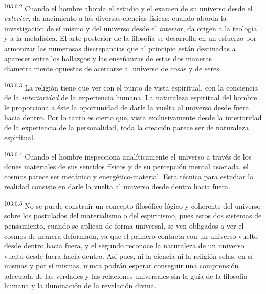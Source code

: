 \documentclass[twoside, 11pt]{book}
\begin{document}
\par
\textsuperscript{103:6.2} Cuando el hombre aborda el estudio y el examen de su universo desde el \textit{exterior}, da nacimiento a las diversas ciencias físicas; cuando aborda la investigación de sí mismo y del universo desde el \textit{interior}, da origen a la teología y a la metafísica. El arte posterior de la filosofía se desarrolla en un esfuerzo por armonizar las numerosas discrepancias que al principio están destinadas a aparecer entre los hallazgos y las enseñanzas de estas dos maneras diametralmente opuestas de acercarse al universo de cosas y de seres.

\par
\textsuperscript{103:6.3} La religión tiene que ver con el punto de vista espiritual, con la conciencia de la \textit{interioridad} de la experiencia humana. La naturaleza espiritual del hombre le proporciona a éste la oportunidad de darle la vuelta al universo desde fuera hacia dentro. Por lo tanto es cierto que, vista exclusivamente desde la interioridad de la experiencia de la personalidad, toda la creación parece ser de naturaleza espiritual.

\par
\textsuperscript{103:6.4} Cuando el hombre inspecciona analíticamente el universo a través de los dones materiales de sus sentidos físicos y de su percepción mental asociada, el cosmos parece ser mecánico y energético-material. Esta técnica para estudiar la realidad consiste en darle la vuelta al universo desde dentro hacia fuera.

\par
\textsuperscript{103:6.5} No se puede construir un concepto filosófico lógico y coherente del universo sobre los postulados del materialismo o del espiritismo, pues estos dos sistemas de pensamiento, cuando se aplican de forma universal, se ven obligados a ver el cosmos de manera deformada, ya que el primero contacta con un universo vuelto desde dentro hacia fuera, y el segundo reconoce la naturaleza de un universo vuelto desde fuera hacia dentro. Así pues, ni la ciencia ni la religión solas, en sí mismas y por sí mismas, nunca podrán esperar conseguir una comprensión adecuada de las verdades y las relaciones universales sin la guía de la filosofía humana y la iluminación de la revelación divina.
\end{document}

